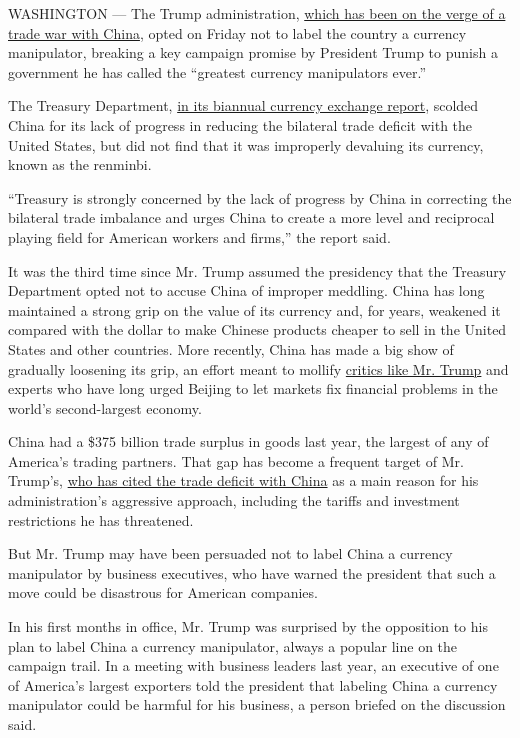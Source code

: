 WASHINGTON --- The Trump administration,
\href{https://www.nytimes.com/2018/04/05/business/trump-trade-war-china.html}{which
has been on the verge of a trade war with China}, opted on Friday not to
label the country a currency manipulator, breaking a key campaign
promise by President Trump to punish a government he has called the
``greatest currency manipulators ever.''

The Treasury Department,
\href{https://home.treasury.gov/news/press-releases/sm0348}{in its
biannual currency exchange report}, scolded China for its lack of
progress in reducing the bilateral trade deficit with the United States,
but did not find that it was improperly devaluing its currency, known as
the renminbi.

``Treasury is strongly concerned by the lack of progress by China in
correcting the bilateral trade imbalance and urges China to create a
more level and reciprocal playing field for American workers and
firms,'' the report said.

It was the third time since Mr. Trump assumed the presidency that the
Treasury Department opted not to accuse China of improper meddling.
China has long maintained a strong grip on the value of its currency
and, for years, weakened it compared with the dollar to make Chinese
products cheaper to sell in the United States and other countries. More
recently, China has made a big show of gradually loosening its grip, an
effort meant to mollify
\href{https://www.nytimes.com/2017/04/14/business/china-currency-manipulation-trump.html}{critics
like Mr. Trump} and experts who have long urged Beijing to let markets
fix financial problems in the world's second-largest economy.

China had a \$375 billion trade surplus in goods last year, the largest
of any of America's trading partners. That gap has become a frequent
target of Mr. Trump's,
\href{https://www.nytimes.com/2018/02/06/us/politics/us-china-trade-deficit.html}{who
has cited the trade deficit with China} as a main reason for his
administration's aggressive approach, including the tariffs and
investment restrictions he has threatened.

But Mr. Trump may have been persuaded not to label China a currency
manipulator by business executives, who have warned the president that
such a move could be disastrous for American companies.

In his first months in office, Mr. Trump was surprised by the opposition
to his plan to label China a currency manipulator, always a popular line
on the campaign trail. In a meeting with business leaders last year, an
executive of one of America's largest exporters told the president that
labeling China a currency manipulator could be harmful for his business,
a person briefed on the discussion said.

